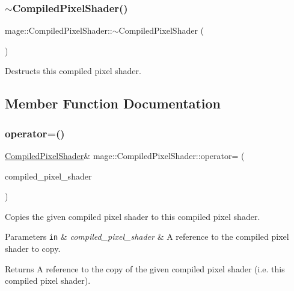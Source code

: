 \subsubsection{\texorpdfstring{$\sim$\+Compiled\+Pixel\+Shader()}{~CompiledPixelShader()}}
{\footnotesize\ttfamily mage\+::\+Compiled\+Pixel\+Shader\+::$\sim$\+Compiled\+Pixel\+Shader (\begin{DoxyParamCaption}{ }\end{DoxyParamCaption})\hspace{0.3cm}{\ttfamily [default]}}

Destructs this compiled pixel shader. 

\subsection{Member Function Documentation}
\hypertarget{structmage_1_1_compiled_pixel_shader_a0dde38701c2e15a52d5d80f992a32551}{}\label{structmage_1_1_compiled_pixel_shader_a0dde38701c2e15a52d5d80f992a32551} 
\subsubsection{\texorpdfstring{operator=()}{operator=()}\hspace{0.1cm}{\footnotesize\ttfamily [1/2]}}
{\footnotesize\ttfamily \hyperlink{structmage_1_1_compiled_pixel_shader}{Compiled\+Pixel\+Shader}\& mage\+::\+Compiled\+Pixel\+Shader\+::operator= (\begin{DoxyParamCaption}\item[{const \hyperlink{structmage_1_1_compiled_pixel_shader}{Compiled\+Pixel\+Shader} \&}]{compiled\+\_\+pixel\+\_\+shader }\end{DoxyParamCaption})\hspace{0.3cm}{\ttfamily [delete]}}

Copies the given compiled pixel shader to this compiled pixel shader.


\begin{DoxyParams}[1]{Parameters}
\mbox{\tt in}  & {\em compiled\+\_\+pixel\+\_\+shader} & A reference to the compiled pixel shader to copy. \\
\hline
\end{DoxyParams}
\begin{DoxyReturn}{Returns}
A reference to the copy of the given compiled pixel shader (i.\+e. this compiled pixel shader). 
\end{DoxyReturn}
\hypertarget{structmage_1_1_compiled_pixel_shader_a347557ae3d91dd0d561c56bc2c811a2f}{}\label{structmage_1_1_compiled_pixel_shader_a347557ae3d91dd0d561c56bc2c811a2f} 
